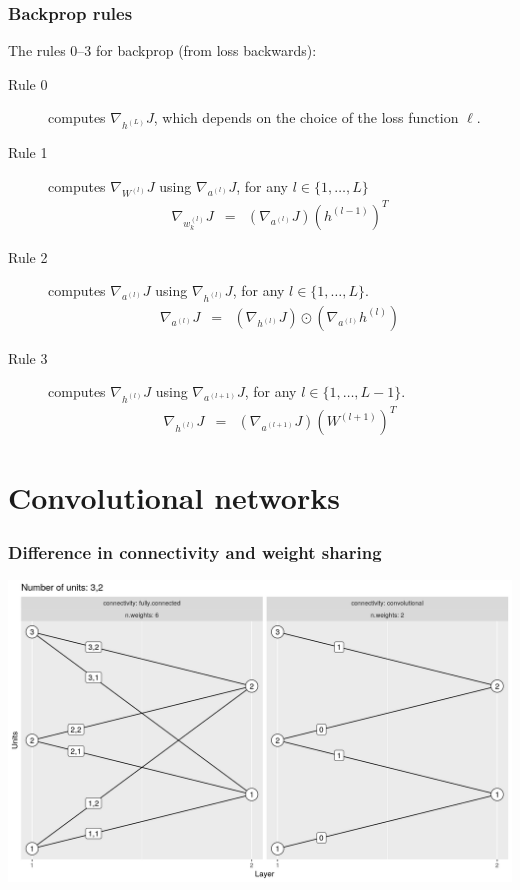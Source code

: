 \documentclass{beamer}
\begin{document}
\begin{frame}
  \frametitle{Backprop rules}
  The rules 0--3 for backprop (from loss backwards):
\begin{description}
\item[Rule 0] computes $\nabla_{h^{(L)}} J$, which depends on the
  choice of the loss function $\ell$.
\item[Rule 1] computes
  $\nabla_{W^{(l)}} J$ using $\nabla_{a^{(l)}} J$, for any $l\in\{1,\dots,L\}$
\begin{eqnarray}
  \nabla_{w_k^{(l)}} J
  &=& \left(\nabla_{a^{(l)}} J\right)
      \left( h^{(l-1)} \right)^T \label{eq:grad-loss-w}
\end{eqnarray}
\item[Rule 2] computes
  $\nabla_{a^{(l)}} J$ using $\nabla_{h^{(l)}} J$, for any $l\in\{1,\dots,L\}$.
\begin{eqnarray}
  \nabla_{a^{(l)}} J
  &=& \left(\nabla_{h^{(l)}} J\right) \odot
      \label{eq:grad-loss-a}
      \left(\nabla_{a^{(l)}} h^{(l)} \right) 
\end{eqnarray}
\item[Rule 3] computes
  $\nabla_{h^{(l)}} J$ using $\nabla_{a^{(l+1)}} J$, for any $l\in\{1,\dots,L-1\}$.
\begin{eqnarray}
  \nabla_{h^{(l)}} J
  &=& \left(\nabla_{a^{(l+1)}} J\right)
      \left(W^{(l+1)}\right)^T \label{eq:grad-loss-h}
\end{eqnarray}
\end{description}

\end{frame}

\section{Convolutional networks}

\begin{frame}
  \frametitle{Difference in connectivity and weight sharing}
  \includegraphics[width=\textwidth]{figure-convolutional-3-2}
  
\end{frame}
\end{document}
